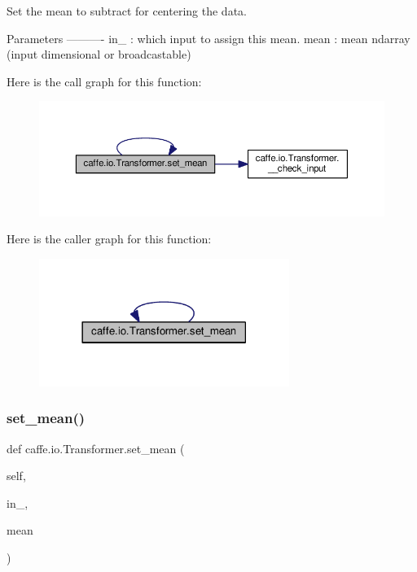 \begin{DoxyVerb}Set the mean to subtract for centering the data.

Parameters
----------
in_ : which input to assign this mean.
mean : mean ndarray (input dimensional or broadcastable)
\end{DoxyVerb}
 Here is the call graph for this function\+:
\nopagebreak
\begin{figure}[H]
\begin{center}
\leavevmode
\includegraphics[width=350pt]{classcaffe_1_1io_1_1_transformer_a7064401b3aa295a6ab61895563a60d16_cgraph}
\end{center}
\end{figure}
Here is the caller graph for this function\+:
\nopagebreak
\begin{figure}[H]
\begin{center}
\leavevmode
\includegraphics[width=230pt]{classcaffe_1_1io_1_1_transformer_a7064401b3aa295a6ab61895563a60d16_icgraph}
\end{center}
\end{figure}
\mbox{\label{classcaffe_1_1io_1_1_transformer_a7064401b3aa295a6ab61895563a60d16}} 
\subsubsection{\texorpdfstring{set\+\_\+mean()}{set\_mean()}\hspace{0.1cm}{\footnotesize\ttfamily [2/2]}}
{\footnotesize\ttfamily def caffe.\+io.\+Transformer.\+set\+\_\+mean (\begin{DoxyParamCaption}\item[{}]{self,  }\item[{}]{in\+\_\+,  }\item[{}]{mean }\end{DoxyParamCaption})}

